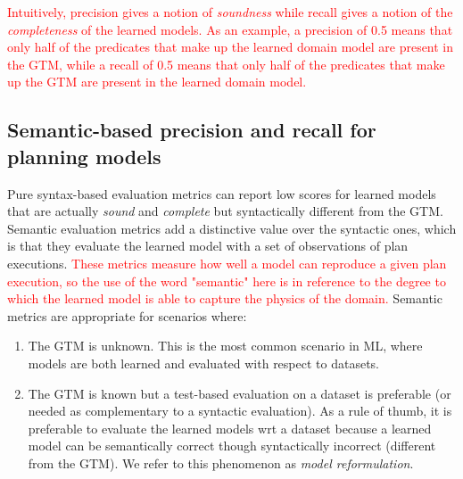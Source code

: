 \textcolor{red}{Intuitively, precision gives a notion of {\em soundness} while recall gives a notion of the {\em completeness} of the learned models.
As an example, a precision of 0.5 means that only half of the predicates that make up the learned domain model are present in the GTM, while a recall of 0.5 means that only half of the predicates that make up the GTM are present in the learned domain model.}

\subsection{Semantic-based precision and recall for planning models}
\label{semantic_precision_recall}

Pure syntax-based evaluation metrics can report low scores for learned models that are actually {\em sound} and {\em complete} but syntactically different from the GTM. Semantic evaluation metrics add a distinctive value over the syntactic ones, which is that they evaluate the learned model with a set of observations of plan executions. \textcolor{red}{These metrics measure how well a model can reproduce a given plan execution, so the use of the word "semantic" here is in reference to the degree to which the learned model is able to capture the physics of the domain.} Semantic metrics are appropriate for scenarios where: 

\begin{enumerate}
	\item The GTM is unknown. This is the most common scenario in ML, where models are both learned and evaluated with respect to datasets.
	\item The GTM is known but a test-based evaluation on a dataset is preferable (or needed as complementary to a syntactic evaluation). As a rule of thumb, it is preferable to evaluate the learned models wrt a dataset because a learned model can be semantically correct though syntactically incorrect (different from the GTM). We refer to this phenomenon as \emph{model reformulation}.
\end{enumerate}

